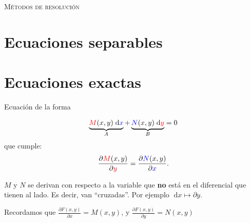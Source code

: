 \documentclass[a4paper]{article}
\newcommand{\dif}[1]{\;\mathrm{d}#1}
\begin{document}
\begin{raggedleft}
    \Large
    \textsc{Métodos de resolución}
\end{raggedleft}

\section{Ecuaciones separables}
\section{Ecuaciones exactas}
Ecuación de la forma

\begin{equation}
    \label{eq:forma-exacta}
    \underbrace{{\color{red}M}(x,y) \dif{{\color{blue}x}}}_{A} + \underbrace{{\color{blue}N}(x,y) \dif{{\color{red} y}}}_{B} = 0
\end{equation}
que cumple:
\begin{equation*}
    \frac{\partial {\color{red}M}(x,y)}{\partial {\color{red}y }} = \frac{\partial {\color{blue} N}(x,y)}{\partial {\color{blue} x}}.
\end{equation*}

\begin{obs}
    $M$ y $N$ se derivan con respecto a la variable que \textbf{no} está en el diferencial que tienen al lado.
    Es decir, van ``cruzadas''.
    Por ejemplo $\dif{x} \mapsto \partial y$.
\end{obs}

Recordamos que $\displaystyle \frac{\partial F(x,y)}{\partial x} = M(x,y)$, y $\displaystyle \frac{\partial F(x,y)}{\partial y} = N(x,y)$
\end{document}

